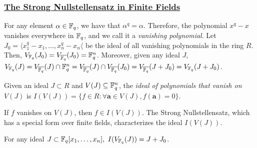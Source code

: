 \subsubsection{\underline{The Strong Nullstellensatz in Finite Fields}}

For any element $\alpha\in{\mathbb{F}}_{q}$, we have that
$\alpha^q=\alpha$. Therefore, the polynomial $x^q-x$ vanishes
everywhere in ${\mathbb{F}}_{q}$, and we call it a {\it vanishing polynomial}. Let
$J_0 = \langle x_1^q-x_1,\dots,x_n^q-x_n\langle$ be the ideal of all
vanishing polynomials in the ring $R$. Then, $V_{{\mathbb{F}}_{q}}(J_0) =
V_{{\overline{{\mathbb{F}}_q}}}(J_0) = {\mathbb{F}}_{q}^n$. Moreover, given any ideal $J$, $V_{{\mathbb{F}}_{q}}(J) =
V_{{\overline{{\mathbb{F}}_q}}}(J) \cap{\mathbb{F}}_{q}^n = V_{{\overline{{\mathbb{F}}_q}}}(J) \cap V_{{\overline{{\mathbb{F}}_q}}}(J_0) =
V_{{\overline{{\mathbb{F}}_q}}}(J+J_0) = V_{{\mathbb{F}}_{q}}(J+J_0)$. 


\begin{Definition}
Given an ideal $J\subset R$ and $V(J) \subseteq {\mathbb{F}}_{q}^n$, the {\it ideal
of polynomials that vanish on} $V(J)$ is $I(V(J)) = \{ f \in R :
\forall \bm{a} \in V(J), f(\bm{a}) = 0\}$.
\end{Definition}

If $f$ vanishes on $V(J)$, then $f \in I(V(J))$. The Strong
Nullstellensatz, which has a special form over finite fields,
characterizes the ideal $I(V(J))$.

\begin{Theorem} \label{thm:strong-ns}  
For any ideal $J \subset {\mathbb{F}}_{q}[x_1,\dots,x_n], ~I(V_{{\mathbb{F}}_{q}}(J)) = J + J_0$.
\end{Theorem}



